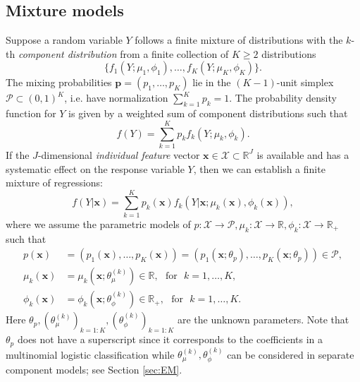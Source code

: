 \documentclass[11pt]{article}
\numberwithin{equation}{section}
\def\R{{\mathbb R}}  %
\def\bp{\boldsymbol{p}}
\def\bx{\boldsymbol{x}}
\def\bp{\boldsymbol{p}}
\begin{document}
\subsection{Mixture models}\label{review:mix1}
Suppose a random variable $Y$ follows a finite mixture of distributions with the $k$-th {\it component distribution} from a finite collection of $K\ge2$ distributions
	$$\{f_1(Y;\mu_1,\phi_1),\ldots,f_K(Y;\mu_K,\phi_K)\}.$$
The mixing probabilities $\bp=(p_1,\ldots,p_K)$ lie in the $(K-1)$-unit simplex $\mathcal{P}\subset(0,1)^K$, i.e. have normalization $\sum_{k=1}^Kp_k=1$.
	The probability density function for $Y$ is given by a weighted sum of component distributions such that
	$$f(Y)=\sum_{k=1}^Kp_kf_k(Y;\mu_k,\phi_k).$$
	If the $J$-dimensional {\it individual feature} vector $\bx\in\mathcal{X}\subset\R^J$ is available and has a systematic effect on the response variable $Y$, then we can establish a finite mixture of regressions:
	\begin{equation}\label{mix-gen}
		f(Y|\bx)=\sum_{k=1}^Kp_k(\bx)f_k(Y|\bx;\mu_k(\bx),\phi_k(\bx)),
	\end{equation}
where we assume the parametric models of $p:\mathcal{X}\rightarrow\mathcal{P},\mu_k:\mathcal{X}\rightarrow\R,\phi_k: \mathcal{X}\rightarrow\R_+$ such that
\begin{align*}
	p(\bx)&=(p_1(\bx),\ldots,p_K(\bx))=(p_1(\bx;\theta_p),\ldots,p_K(\bx;\theta_p))\in\mathcal{P},\\
	\mu_k(\bx)&=\mu_k(\bx;\theta_\mu^{(k)})\in\R,\text{~~for~~}k=1,\ldots,K,\\
	\phi_k(\bx)&=\phi_k(\bx;\theta_\phi^{(k)})\in\R_+,\text{~~for~~}k=1,\ldots,K.
\end{align*}
Here $\theta_p, (\theta_\mu^{(k)})_{k=1:K}, (\theta_\phi^{(k)})_{k=1:K}$ are the unknown parameters.
Note that $\theta_p$ does not have a superscript since it corresponds to the coefficients in a multinomial logistic classification while $\theta_\mu^{(k)},\theta_\phi^{(k)}$ can be considered in separate component models; see Section \ref{sec:EM}.
\end{document}
